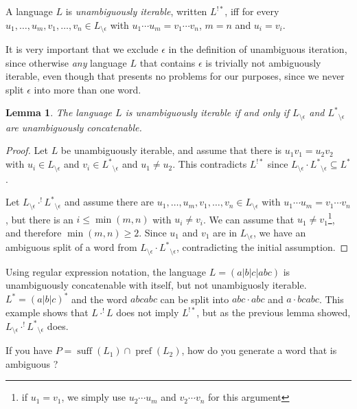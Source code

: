 \documentclass{amsart}
\newcommand{\ensmath}[1]{\ensuremath{#1}\xspace}
\newcommand{\suff}{\ensmath{\operatorname{suff}}}
\newcommand{\pref}{\ensmath{\operatorname{pref}}}
\newcommand{\uaconc}[2]{\ensmath{#1\cdot^{!} #2}}
\newcommand{\cstar}[1]{\ensmath{#1^*}}
\newcommand{\uastar}[1]{\ensmath{#1^{!*}}}
\newcommand{\noeps}[1]{\ensmath{{#1}_{\setminus \epsilon}}}
\newtheorem{lemma}[theorem]{Lemma}
{\theoremstyle{definition} 
  \newtheorem{defn}{Definition}
  \newtheorem*{remark}{Remark}
  \newtheorem*{example}{Example}}
\begin{document}
\begin{defn}
A language $L$ is \emph{unambiguously iterable}, written \uastar{L}, iff
for every $u_1,\dots,u_m, v_1,\dots,v_n \in \noeps{L}$ with $u_1\cdots u_m
= v_1 \cdots v_n$, $m=n$ and $u_i = v_i$.
\end{defn}

It is very important that we exclude $\epsilon$ in the definition of
unambiguous iteration, since otherwise \emph{any} language $L$ that
contains $\epsilon$ is trivially not ambiguously iterable, even though that
presents no problems for our purposes, since we never split $\epsilon$ into
more than one word.

\begin{lemma}
The language $L$ is unambiguously iterable if and only if $\noeps{L}$ and
$\noeps{\cstar{L}}$ are unambiguously concatenable.
\end{lemma}
\begin{proof}
Let $L$ be unambiguously iterable, and assume that there is $u_1v_1 =
u_2v_2$ with $u_i \in \noeps{L}$ and $v_i \in \noeps{\cstar{L}}$ and $u_1
\neq u_2$. This contradicts $\uastar{L}$ since $\noeps{L}\cdot
\noeps{\cstar{L}}\subseteq \cstar{L}$.

Let $\uaconc{\noeps{L}}{\noeps{\cstar{L}}}$ and assume there are
$u_1,\dots,u_m, v_1,\dots,v_n \in \noeps{L}$ with $u_1\cdots u_m = v_1
\cdots v_n$, but there is an $i \leq \min(m,n)$ with $u_i \neq v_i$. We can
assume that $u_1 \neq v_1$\footnote{if $u_1 = v_1$, we simply use
  $u_2\cdots u_m$ and $v_2 \cdots v_n$ for this argument}, and therefore
$\min(m,n)\geq 2$. Since $u_1$ and $v_1$ are in $\noeps{L}$, we have an
ambiguous split of a word from $\noeps{L}\cdot\noeps{\cstar{L}}$,
contradicting the initial assumption.
\end{proof}

\begin{example}
Using regular expression notation, the language $L=(a|b|c|abc)$ is
unambiguously concatenable with itself, but not unambiguosly
iterable. $\cstar{L} = (a|b|c)^*$ and the word $abcabc$ can be split into
$abc\cdot abc$ and $a\cdot bcabc$. This example shows that $\uaconc{L}{L}$
does not imply $\uastar{L}$, but as the previous lemma showed,
$\uaconc{\noeps{L}}{\noeps{\cstar{L}}}$ does.
\end{example}

If you have $P = \suff(L_1) \cap \pref(L_2)$, how do you generate a word that
is ambiguous ?
\end{document}
